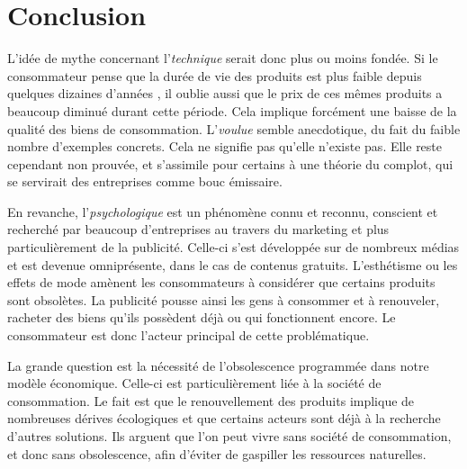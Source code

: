 \chapter*{Conclusion}

%
%
%
%
%

L'idée de mythe concernant l'\op \textit{technique} serait donc plus ou moins fondée. Si le consommateur pense que la durée de vie des produits est plus faible depuis quelques dizaines d'années , il oublie aussi que le prix de ces mêmes produits a beaucoup diminué durant cette période. Cela implique forcément une baisse de la qualité des biens de consommation. L'\op \textit{voulue} semble anecdotique, du fait du faible nombre d'exemples concrets. Cela ne signifie pas qu'elle n'existe pas. Elle reste cependant non prouvée, et s'assimile pour certains à une théorie du complot, qui se servirait des entreprises comme bouc émissaire. 

\bigbreak
En revanche, l'\op \textit{psychologique} est un phénomène connu et reconnu, conscient et recherché par beaucoup d'entreprises au travers du marketing et plus particulièrement de la publicité. Celle-ci s'est développée sur de nombreux médias et est devenue omniprésente, dans le cas de contenus gratuits. L'esthétisme ou les effets de mode amènent les consommateurs à considérer que certains produits sont obsolètes. La publicité pousse ainsi les gens à consommer et à renouveler, racheter des biens qu'ils possèdent déjà ou qui fonctionnent encore. Le consommateur est donc l’acteur principal de cette problématique.

\bigbreak
La grande question est la nécessité de l'obsolescence programmée dans notre modèle économique. Celle-ci est particulièrement liée à la société de consommation. Le fait est que le renouvellement des produits implique de nombreuses dérives écologiques et que certains acteurs sont déjà à la recherche d'autres solutions. Ils arguent que l'on peut vivre sans société de consommation, et donc sans obsolescence, afin d'éviter de gaspiller les ressources naturelles.